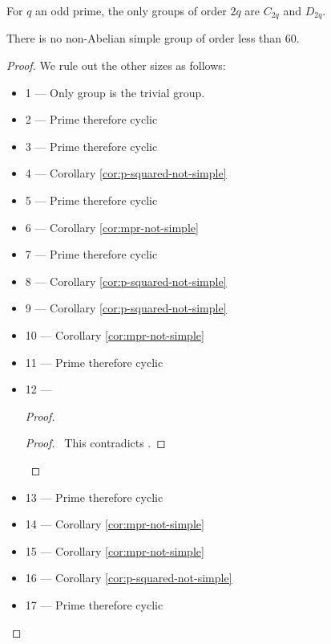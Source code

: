 \begin{cor}
For $q$ an odd prime, the only groups of order $2q$ are $C_{2q}$ and $D_{2q}$.
\end{cor}

\begin{prop}
There is no non-Abelian simple group of order less than 60.
\end{prop}

\begin{proof}
\pf
We rule out the other sizes as follows:
\begin{itemize}
\item 1 --- Only group is the trivial group.
\item 2 --- Prime therefore cyclic
\item 3 --- Prime therefore cyclic
\item 4 --- Corollary \ref{cor:p-squared-not-simple}
\item 5 --- Prime therefore cyclic
\item 6 --- Corollary \ref{cor:mpr-not-simple}
\item 7 --- Prime therefore cyclic
\item 8 --- Corollary \ref{cor:p-squared-not-simple}
\item 9 --- Corollary \ref{cor:p-squared-not-simple}
\item 10 --- Corollary \ref{cor:mpr-not-simple}
\item 11 --- Prime therefore cyclic
\item 12 ---
\begin{proof}
	\qedstep
	\begin{proof}
		\pf\ This contradicts .
	\end{proof}
\end{proof}
\item 13 --- Prime therefore cyclic
\item 14 --- Corollary \ref{cor:mpr-not-simple}
\item 15 --- Corollary \ref{cor:mpr-not-simple}
\item 16 --- Corollary \ref{cor:p-squared-not-simple}
\item 17 --- Prime therefore cyclic

\end{itemize}
\end{proof}
